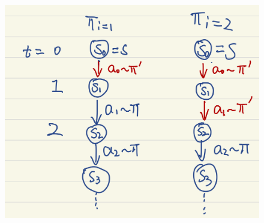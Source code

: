 \documentclass[11pt]{article}
\theoremstyle{case}
\begin{document}
\begin{enumerate}[label=(\alph*)]
\begin{figure}[h]
\includegraphics[scale=.7]{assignment1_2.png}
\centering
\end{figure}


\end{enumerate}
\end{document}
